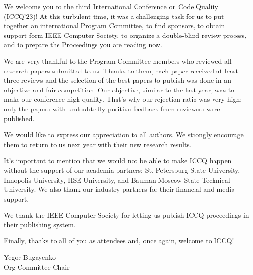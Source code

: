 
\cleardoublepage
{}

We welcome you to the third International Conference on Code Quality (ICCQ'23)!
At this turbulent time,
it was a challenging task for us
to put together an international Program Committee,
to find sponsors,
to obtain support form IEEE Computer Society,
to organize a double-blind review process,
and to prepare the Proceedings you are reading now.

We are very thankful to the Program Committee members who
reviewed all research papers submitted to us. Thanks to them,
each paper received at least three reviews and the selection of the best papers to publish
was done in an objective and fair competition. Our objective,
similar to the last year, was to make our conference high quality.
That's why our rejection ratio was very high: only the
papers with undoubtedly positive feedback from reviewers were published.

We would like to express our appreciation to all authors.
We strongly encourage them to return to us next year
with their new research results.

It's important to mention that we would not be able to make
ICCQ happen without the support of our academia partners:
St. Petersburg State University,
Innopolis University,
HSE University,
and
Bauman Moscow State Technical University.
We also thank our industry partners for their financial and media support.

We thank the IEEE Computer Society for letting us publish ICCQ proceedings
in their publishing system.

Finally, thanks to all of you as attendees and, once again, welcome to ICCQ!

\vspace{18pt}
Yegor Bugayenko\\
Org Committee Chair
